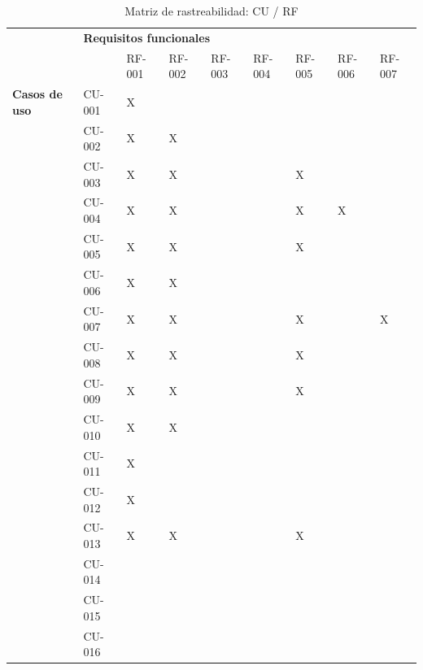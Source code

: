 \begin{table}[htpb]
\centering
\begin{tabularx}{\textwidth}{|l|X|X|X|X|X|X|X|X|}
\hline
\rowcolor[gray]{0.9}\multicolumn{2}{|l|}{\multirow{2}{*}{}} & \multicolumn{7}{l|}{\textbf{Requisitos funcionales}}                  \\ \cline{3-9} 
\multicolumn{2}{|l|}{}                  & RF-001 & RF-002 & RF-003 & RF-004 & RF-005 & RF-006 & RF-007 \\ \hline
\textbf{Casos de uso}             & CU-001       & X      &        &        &        &        &        &        \\ \hline
\multirow{15}{*}{}       & CU-002       & X      & X      &        &        &        &        &        \\ \cline{2-9} 
                         & CU-003       & X      & X      &        &        & X      &        &        \\ \cline{2-9} 
                         & CU-004       & X      & X      &        &        & X      & X      &        \\ \cline{2-9} 
                         & CU-005       & X      & X      &        &        & X      &        &        \\ \cline{2-9} 
                         & CU-006       & X      & X      &        &        &        &        &        \\ \cline{2-9} 
                         & CU-007       & X      & X      &        &        & X      &        & X      \\ \cline{2-9} 
                         & CU-008       & X      & X      &        &        & X      &        &        \\ \cline{2-9} 
                         & CU-009       & X      & X      &        &        & X      &        &        \\ \cline{2-9} 
                         & CU-010       & X      & X      &        &        &        &        &        \\ \cline{2-9} 
                         & CU-011       & X      &        &        &        &        &        &        \\ \cline{2-9} 
                         & CU-012       & X      &        &        &        &        &        &        \\ \cline{2-9} 
                         & CU-013       & X      & X      &        &        & X      &        &        \\ \cline{2-9} 
                         & CU-014       &        &        &        &        &        &        &        \\ \cline{2-9} 
                         & CU-015       &        &        &        &        &        &        &        \\ \cline{2-9} 
                         & CU-016       &        &        &        &        &        &        &        \\ \hline
\end{tabularx}
\caption{Matriz de rastreabilidad: CU / RF}
\label{mat_rast_cu_rf}
\end{table}


